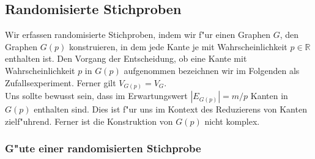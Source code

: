 \subsection{Randomisierte Stichproben}

Wir erfassen randomisierte Stichproben, indem wir f"ur einen Graphen $G$, den
    Graphen $G(p)$ konstruieren, in dem jede Kante je mit Wahrscheinlichkeit 
    $p \in \mathbb{R}$ enthalten ist. 
    Den Vorgang der Entscheidung, ob eine Kante mit Wahrscheinlichkeit $p$
    in $G(p)$ aufgenommen bezeichnen wir  im Folgenden als Zufallsexperiment.
    Ferner gilt $V_{G(p)} = V_G$.\\
Uns sollte bewusst sein, dass im Erwartungswert $|E_{G(p)}| = m / p$ Kanten
    in $G(p)$ enthalten sind.
    Dies ist f"ur uns im Kontext des Reduzierens von Kanten zielf"uhrend.
    Ferner ist die Konstruktion von $G(p)$ nicht komplex.\\

\subsubsection{G"ute einer randomisierten Stichprobe}
\label{sec:goodnessRand}


